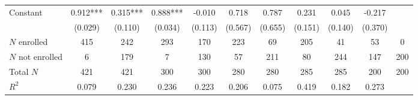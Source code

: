 \begin{tabular}{lcccccccccc}
Constant & 0.912*** & 0.315*** & 0.888*** & -0.010 & 0.718 & 0.787 & 0.231 & 0.045 & -0.217 &  \\
 & (0.029) & (0.110) & (0.034) & (0.113) & (0.567) & (0.655) & (0.151) & (0.140) & (0.370) &  \\
\midrule
$N$ enrolled & 415 & 242 & 293 & 170 & 223 & 69 & 205 & 41 & 53 & 0 \\
$N$ not enrolled & 6 & 179 & 7 & 130 & 57 & 211 & 80 & 244 & 147 & 200 \\
Total $N$ & 421 & 421 & 300 & 300 & 280 & 280 & 285 & 285 & 200 & 200 \\
$R^2$ & 0.079 & 0.230 & 0.236 & 0.223 & 0.206 & 0.075 & 0.419 & 0.182 & 0.273 &  \\ \midrule
\end{tabular}
